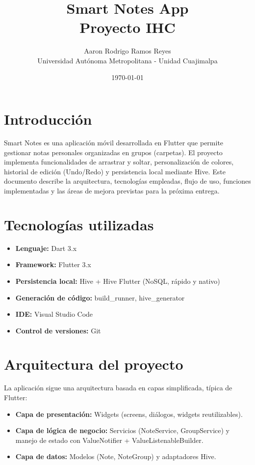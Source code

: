 \documentclass[12pt,a4paper]{article}
\title{\textbf{Smart Notes App} \\ \large Proyecto IHC}
\author{Aaron Rodrigo Ramos Reyes \\ Universidad Autónoma Metropolitana - Unidad Cuajimalpa}
\date{\today}
\begin{document}
\maketitle
\thispagestyle{empty}
\newpage

\tableofcontents
\newpage

\section{Introducción}
Smart Notes es una aplicación móvil desarrollada en Flutter que permite gestionar notas personales organizadas en grupos (carpetas). El proyecto implementa funcionalidades de arrastrar y soltar, personalización de colores, historial de edición (Undo/Redo) y persistencia local mediante Hive. Este documento describe la arquitectura, tecnologías empleadas, flujo de uso, funciones implementadas y las áreas de mejora previstas para la próxima entrega.

\section{Tecnologías utilizadas}
\begin{itemize}
    \item \textbf{Lenguaje:} Dart 3.x
    \item \textbf{Framework:} Flutter 3.x
    \item \textbf{Persistencia local:} Hive + Hive Flutter (NoSQL, rápido y nativo)
    \item \textbf{Generación de código:} build\_runner, hive\_generator
    \item \textbf{IDE:} Visual Studio Code
    \item \textbf{Control de versiones:} Git
\end{itemize}

\section{Arquitectura del proyecto}
La aplicación sigue una arquitectura basada en capas simplificada, típica de Flutter:
\begin{itemize}
    \item \textbf{Capa de presentación:} Widgets (screens, diálogos, widgets reutilizables).
    \item \textbf{Capa de lógica de negocio:} Servicios (NoteService, GroupService) y manejo de estado con ValueNotifier + ValueListenableBuilder.
    \item \textbf{Capa de datos:} Modelos (Note, NoteGroup) y adaptadores Hive.
\end{itemize}
\end{document}
